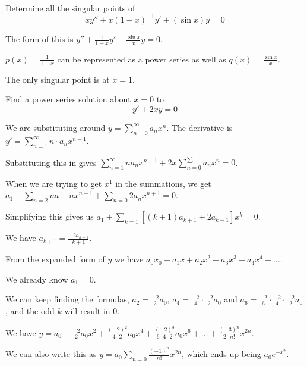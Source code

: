 \documentclass[../diffeq.tex]{subfiles}
\begin{document}
\begin{example}
    Determine all the singular points of 
    \[ xy''+x(1-x)^{-1}y'+(\sin x)y=0 \]

    The form of this is $y''+\frac{1}{1-x}y'+\frac{\sin x}{x}y=0$.

    $p(x)=\frac{1}{1-x}$ can be represented as a power series as well as $q(x)=\frac{\sin x}{x}$.

    The only singular point is at $x=1$.
\end{example}

\begin{example}
    Find a power series solution about $x=0$ to 
    \[ y'+2xy=0 \]

    We are substituting around $y=\sum_{n=0}^{\infty}a_nx^n$. The derivative is $y'=\sum_{n=1}^{\infty} n\cdot a_nx^{n-1}$.

    Substituting this in gives $\sum_{n=1}^{\infty} na_nx^{n-1}+2x\sum_{n=0}^{\sum} a_nx^n =0$.

    When we are trying to get $x^1$ in the summations, we get $a_1 + \sum_{n=2}na+nx^{n-1}+\sum_{n=0}2a_nx^{n+1}=0$.

    Simplifying this gives us $a_1+\sum_{k=1}[(k+1)a_{k+1}+2a_{k-1}]x^k=0$.

    We have $a_{k+1}=\frac{-2a_{k-1}}{k+1}$.

    From the expanded form of $y$ we have $a_0x_0+a_1x+a_2x^2+a_3x^3+a_4x^4+\dots$. 

    We already know $a_1=0$.

    We can keep finding the formulas, $a_2=\frac{-2}{2}a_0$, $a_4=\frac{-2}{4}\cdot \frac{-2}{2}a_0$ and $a_6=\frac{-2}{6}\cdot \frac{-2}{4}\cdot \frac{-2}{2}a_0$, and the odd $k$ will result in $0$.

    We have $y=a_0+\frac{-2}{2}a_0x^2+\frac{(-2)^2}{4\cdot 2}a_0x^4+\frac{(-2)^3}{6\cdot 4\cdot 2}a_0x^6+\dots + \frac{(-3)^n}{2\cdot n!}x^{2n}$.

    We can also write this as $y=a_0\sum_{n=0}\frac{(-1)^n}{n!}x^{2n}$, which ends up being $a_0e^{-x^2}$.
\end{example}
\end{document}
